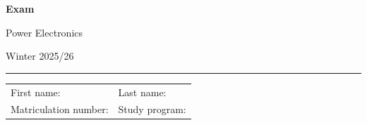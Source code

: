 \begin{center}

	{\vspace{3mm}\Large \textbf{
			\textsf{Exam}}
		\vspace{3mm}

		\LARGE
		\textsf{Power Electronics}

		\vspace{6mm}
		\large

		Winter 2025/26
		\vspace{5mm}
	}

\end{center}

\hrule

\vspace{5mm}

\begin{flushleft}
	\begin{tabular}{ll}
		First name:  \qquad \qquad \qquad  \qquad \qquad\qquad \qquad \qquad & Last name:     \\[1cm]
		Matriculation number:                                                & Study program:
	\end{tabular}
\end{flushleft}

